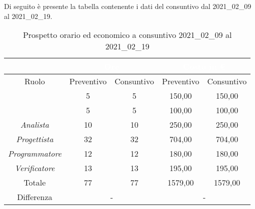 Di seguito è presente la tabella contenente i dati del consuntivo dal 2021\_02\_09 al 2021\_02\_19.
\begin{table}[H]
	\centering
	\begin{tabular}{|c|c|c|c|c|}
		\rowcolor{darkblue} 
		&\multicolumn{2}{c|}{\textcolor{white}{Ore}}&\multicolumn{2}{c|}{\textcolor{white}{Costo in €}}\\ \hline
		Ruolo			&	Preventivo				&	Consuntivo		&	Preventivo	&	Consuntivo\\ \hline
		{\Responsabile}		&	5					&	5				&	150,00		&	150,00 \\ \hline
		{\Amministratore}	&	5					&	5				&	100,00		&	100,00 \\ \hline
		\textit{Analista}	&	10					&	10				&	250,00		&	250,00 \\ \hline
		\textit{Progettista}& 	32					&32 				& 	704,00		&  	704,00 \\ \hline
		\textit{Programmatore}& 12					& 	12				& 	180,00			&  	180,00 \\ \hline
		\textit{Verificatore}&	13					&	13				&	195,00		&	195,00 \\ \hline
		Totale				&	77					&	77				&	1579,00		&	1579,00 \\ \hline
		Differenza			& 	\multicolumn{2}{c|}{-} 			&\multicolumn{2}{c|}{-}\\ \hline
	\end{tabular}
	\caption{Prospetto orario ed economico a consuntivo 2021\_02\_09 al 2021\_02\_19}
\end{table}

